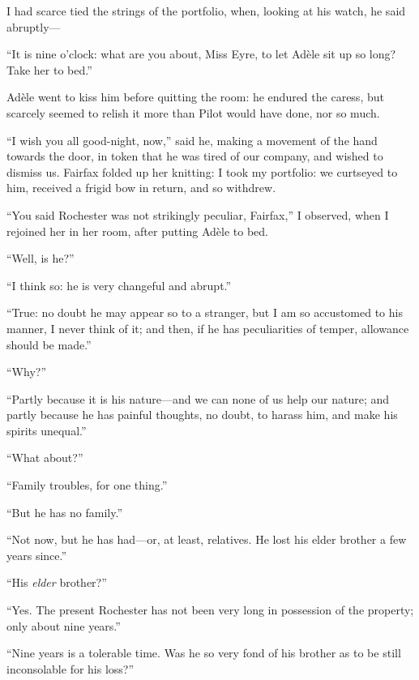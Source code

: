 I had scarce tied the strings of the portfolio, when, looking at his
watch, he said abruptly---

\enquote{It is nine o'clock: what are you about, Miss Eyre, to let Adèle
sit up so long? Take her to bed.}

Adèle went to kiss him before quitting the room: he endured the caress,
but scarcely seemed to relish it more than Pilot would have done, nor so
much.

\enquote{I wish you all good-night, now,} said he, making a movement of
the hand towards the door, in token that he was tired of our company,
and wished to dismiss us. \Mrs{} Fairfax folded up her knitting: I took
my portfolio: we curtseyed to him, received a frigid bow in return, and
so withdrew.

\enquote{You said \Mr{} Rochester was not strikingly peculiar, \Mrs{}
Fairfax,} I observed, when I rejoined her in her room, after putting
Adèle to bed.

\enquote{Well, is he?}

\enquote{I think so: he is very changeful and abrupt.}

\enquote{True: no doubt he may appear so to a stranger, but I am so
accustomed to his manner, I never think of it; and then, if he has
peculiarities of temper, allowance should be made.}

\enquote{Why?}

\enquote{Partly because it is his nature---and we can none of us help
our nature; and partly because he has painful thoughts, no doubt, to
harass him, and make his spirits unequal.}

\enquote{What about?}

\enquote{Family troubles, for one thing.}

\enquote{But he has no family.}

\enquote{Not now, but he has had---or, at least, relatives. He lost his
elder brother a few years since.}

\enquote{His \emph{elder} brother?}

\enquote{Yes. The present \Mr{} Rochester has not been very long in
possession of the property; only about nine years.}

\enquote{Nine years is a tolerable time. Was he so very fond of his
brother as to be still inconsolable for his loss?}

